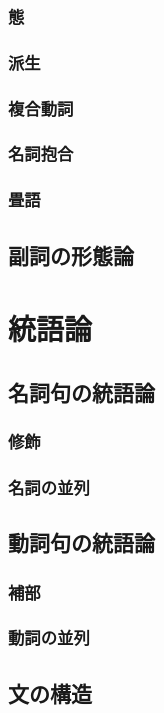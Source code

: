 \subsubsection{態}
\subsubsection{派生}
\subsubsection{複合動詞}
\subsubsection{名詞抱合}
\subsubsection{畳語}
\subsection{副詞の形態論}

\section{統語論}
\subsection{名詞句の統語論}
\subsubsection{修飾}
\subsubsection{名詞の並列}
\subsection{動詞句の統語論}
\subsubsection{補部}
\subsubsection{動詞の並列}
\subsection{文の構造}